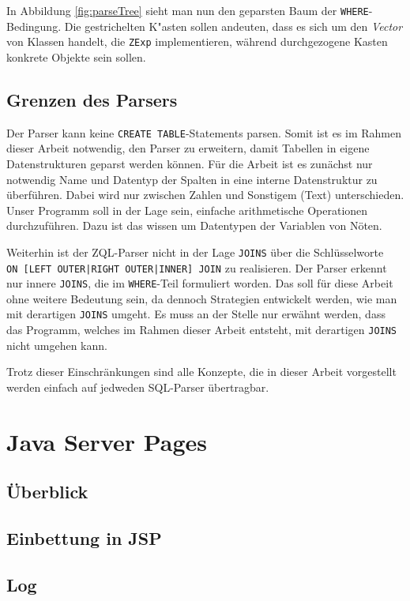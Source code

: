 In Abbildung \ref{fig:parseTree} sieht man nun den geparsten Baum der \verb|WHERE|-Bedingung. Die gestrichelten K"asten sollen andeuten, dass es sich um den \textit{Vector} von Klassen handelt, die \verb|ZExp| implementieren, während durchgezogene Kasten konkrete Objekte sein sollen.

\subsection{Grenzen des Parsers}

Der Parser kann keine \verb|CREATE TABLE|-Statements parsen. Somit ist es im Rahmen dieser Arbeit notwendig, den Parser zu erweitern, damit Tabellen in eigene Datenstrukturen geparst werden können. Für die Arbeit ist es zunächst nur notwendig Name und Datentyp der Spalten in eine interne Datenstruktur zu überführen. Dabei wird nur zwischen Zahlen und Sonstigem (Text) unterschieden. Unser Programm soll in der Lage sein, einfache arithmetische Operationen durchzuführen. Dazu ist das wissen um Datentypen der Variablen von Nöten.

Weiterhin ist der ZQL-Parser nicht in der Lage \verb|JOINS| über die Schlüsselworte \\\verb#ON [LEFT OUTER|RIGHT OUTER|INNER] JOIN# zu realisieren. Der Parser erkennt nur innere \verb|JOINS|, die im \verb|WHERE|-Teil formuliert worden. Das soll für diese Arbeit ohne weitere Bedeutung sein, da dennoch Strategien entwickelt werden, wie man mit derartigen \verb|JOINS| umgeht. Es muss an der Stelle nur erwähnt werden, dass das Programm, welches im Rahmen dieser Arbeit entsteht, mit derartigen \verb|JOINS| nicht umgehen kann.

Trotz dieser Einschränkungen sind alle Konzepte, die in dieser Arbeit vorgestellt werden einfach auf jedweden SQL-Parser übertragbar.


\section{Java Server Pages}

\subsection{Überblick}

\subsection{Einbettung in JSP}

\subsection{Log}